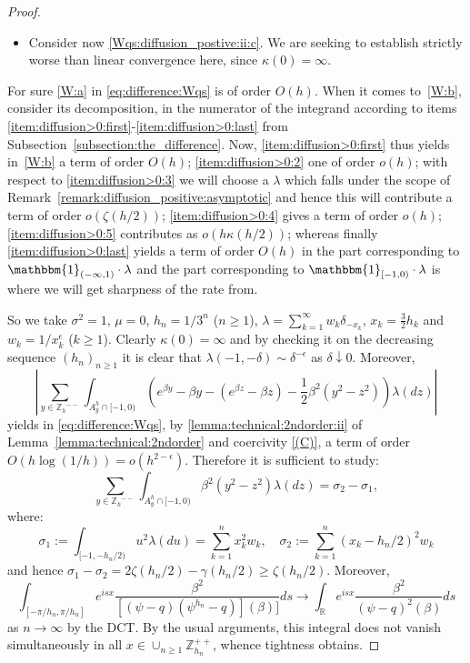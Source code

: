 \documentclass[pdftex,oneside,11pt,reqno]{amsart}
\theoremstyle{definition}
\theoremstyle{theorem}
\theoremstyle{remark}
\numberwithin{equation}{section}
\numberwithin{definition}{section}
\begin{document}
\begin{proof}
\begin{itemize}
\item Consider now \ref{Wqs:diffusion_postive:ii:c}. We are seeking to establish strictly worse than linear convergence here, since $\kappa(0)=\infty$. 
\end{itemize}
For sure \ref{W:a} in \eqref{eq:difference:Wqs} is of order $O(h)$. When it comes to~\ref{W:b}, consider its decomposition, in the numerator of the integrand according to items \ref{item:diffusion>0:first}-\ref{item:diffusion>0:last} from Subsection~\ref{subsection:the_difference}. Now, \ref{item:diffusion>0:first} thus yields in~\ref{W:b} a term of order $O(h)$; \ref{item:diffusion>0:2} one of order $o(h)$; with respect to \ref{item:diffusion>0:3} we will choose a ${\lambda}$ which falls under the scope of Remark~\ref{remark:diffusion_positive:asymptotic} and hence this will contribute a term of order $o(\zeta(h/2))$; \ref{item:diffusion>0:4} gives a term of order $o(h)$; \ref{item:diffusion>0:5} contributes as $o(h\kappa(h/2))$; whereas finally \ref{item:diffusion>0:last} yields a term of order $O(h)$ in the part corresponding to $\mathbbm{1}_{(-\infty,1)}\cdot{\lambda}$ and the part corresponding to $\mathbbm{1}_{[-1,0)}\cdot{\lambda}$ is where we will get sharpness of the rate from. 

So we take ${\sigma^2}=1$, ${\mu}=0$, $h_n=1/3^n$ ($n\geq 1$), ${\lambda}=\sum_{k=1}^\infty w_k\delta_{-x_k}$,  $x_k=\frac{3}{2}h_k$ and $w_k=1/x_k^\epsilon$ ($k\geq 1$). Clearly $\kappa(0)=\infty$ and by checking it on the decreasing sequence $(h_n)_{n\geq 1}$ it is clear that $\lambda(-1,-\delta)\sim \delta^{-\epsilon}$ as $\delta\downarrow 0$. Moreover, $$\left\vert\sum_{y\in {\mathbb{Z}_h}^{--}}\!\int_{A^h_y\cap [-1,0)}\left(e^{\beta y}-\beta y-(e^{\beta z}-\beta z)-\frac{1}{2}\beta^2(y^2-z^2)\right){\lambda}(dz)\right\vert$$
yields in \eqref{eq:difference:Wqs}, by \ref{lemma:technical:2ndorder:ii} of Lemma~\ref{lemma:technical:2ndorder} and coercivity \ref{(C)}, a term of order $O(h\log(1/h))=o(h^{2-\epsilon})$. Therefore it is sufficient to study: $$\sum_{y\in {\mathbb{Z}_h}^{--}}\!\int_{A^h_y\cap [-1,0)}\beta^2(y^2-z^2){\lambda}(dz)=\sigma_2-\sigma_1,$$ where:
\begin{equation*}
\sigma_1:=\int_{[-1,-h_n/2)}u^2{\lambda}(du)=\sum_{k=1}^nx_k^2w_k,\quad \sigma_2:=\sum_{k=1}^n(x_k-h_n/2)^2w_k
\end{equation*}
and hence $\sigma_1-\sigma_2=2\zeta(h_n/2)-\gamma(h_n/2)\geq \zeta(h_n/2)$. Moreover, $$\int_{[-\pi/h_n,\pi/h_n]}e^{isx}\frac{\beta^2}{ [(\psi-q)(\psi^{h_n}-q)](\beta)]}ds\to\int_{\mathbb{R}}e^{isx}\frac{\beta^2}{(\psi-q)^2(\beta)}ds$$ as $n\to\infty$ by the DCT. By the usual arguments, this integral does not vanish simultaneously in all $x\in \cup_{n\geq 1}\mathbb{Z}_{h_n}^{++ }$, whence tightness obtains.
\end{proof}
\end{document}
